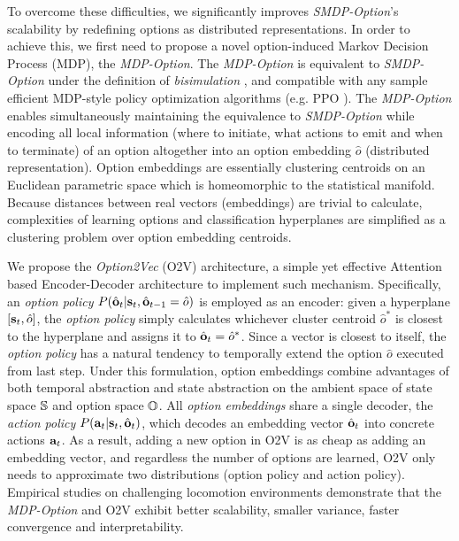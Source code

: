 \documentclass{article}
\begin{document}
To overcome these difficulties, we significantly improves
\emph{SMDP-Option}'s scalability by redefining options as
distributed representations. In order to achieve this, we first
need to propose a novel option-induced Markov Decision Process
(MDP), the \emph{MDP-Option}. The \emph{MDP-Option} is equivalent
to \emph{SMDP-Option} under the definition of \emph{bisimulation}
\cite{givan2003equivalence}, and compatible with any sample
efficient MDP-style policy optimization algorithms (e.g. PPO
\cite{witoonchart2017application}). The \emph{MDP-Option} enables
simultaneously maintaining the equivalence to \emph{SMDP-Option}
while encoding all local information (where to initiate, what
actions to emit and when to terminate) of an option altogether
into an option embedding $\hat{o}$ (distributed representation).
Option embeddings are essentially clustering centroids on an
Euclidean parametric space \cite{amari1987differential} which is
homeomorphic to the statistical manifold. Because distances
between real vectors (embeddings) are trivial to calculate,
complexities of learning options and classification hyperplanes
are simplified as a clustering problem over option embedding
centroids.

We propose the \emph{Option2Vec} (O2V) architecture, a simple yet
effective Attention \cite{vaswani2017attention} based
Encoder-Decoder architecture to implement such mechanism.
Specifically, an \emph{option policy}
$P(\hat{{\mathbf{o}}}_t|{\mathbf{s}}_t,\hat{{\mathbf{o}}}_{t-1}=\hat{o})$ is employed as
an encoder: given a hyperplane $[{\mathbf{s}}_t,\hat{o}]$, the
\emph{option policy} simply calculates whichever cluster centroid
$\hat{o}^*$ is closest to the hyperplane and assigns it to
$\hat{{\mathbf{o}}}_t=\hat{o}^*$. Since a vector is closest to itself,
the \emph{option policy} has a natural tendency to temporally
extend the option $\hat{o}$ executed from last step. Under this
formulation, option embeddings combine advantages of both
temporal abstraction \cite{sutton1999between} and state
abstraction \cite{knoblock1990learning} on the ambient space of
state space ${\mathbb{S}}$ and option space ${\mathbb{O}}$. All \emph{option
  embeddings} share a single decoder, the \emph{action policy}
$P({\mathbf{a}}_t|{\mathbf{s}}_t,\hat{{\mathbf{o}}}_t)$, which decodes an embedding
vector $\hat{{\mathbf{o}}}_t$ into concrete actions ${\mathbf{a}}_t$. As a
result, adding a new option in O2V is as cheap as adding an
embedding vector, and regardless the number of options are
learned, O2V only needs to approximate two distributions (option
policy and action policy). Empirical studies on challenging
locomotion environments demonstrate that the \emph{MDP-Option}
and O2V exhibit better scalability, smaller variance, faster
convergence and interpretability.
\end{document}
